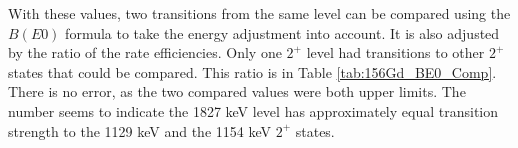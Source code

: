 With these values, two transitions from the same level can be compared using the $B(E0)$ formula to take the energy adjustment into account. It is also adjusted by the ratio of the rate efficiencies. Only one $2^+$ level had transitions to other $2^+$ states that could be compared. This ratio is in Table \ref{tab:156Gd_BE0_Comp}. There is no error, as the two compared values were both upper limits. The number seems to indicate the 1827 keV level has approximately equal transition strength to the 1129 keV and the 1154 keV $2^+$ states.

\afterpage{}

\afterpage{}
